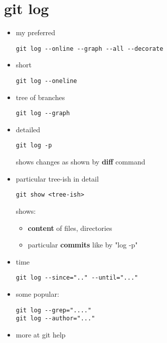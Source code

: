 \documentclass{report}
\begin{document}
\section{git log}
\begin{itemize}

\item my preferred
\begin{verbatim}
git log --online --graph --all --decorate
\end{verbatim}

\item short
\begin{verbatim}
git log --oneline
\end{verbatim}

\item tree of branches
\begin{verbatim}
git log --graph
\end{verbatim}

\item detailed
\begin{verbatim}
git log -p
\end{verbatim}
shows changes as shown by \textbf{diff}  command

\item particular tree-ish in detail
\begin{verbatim}
git show <tree-ish>
\end{verbatim}
shows:
\begin{itemize}
\item \textbf{content} of files, directories
\item particular \textbf{commits} like by "log -p"
\end{itemize}

\item time
\begin{verbatim}
git log --since=".." --until="..."
\end{verbatim}

\item some popular:
\begin{verbatim}
git log --grep="...."
git log --author="..."
\end{verbatim}

\item more at git help 

\end{itemize}
\end{document}
